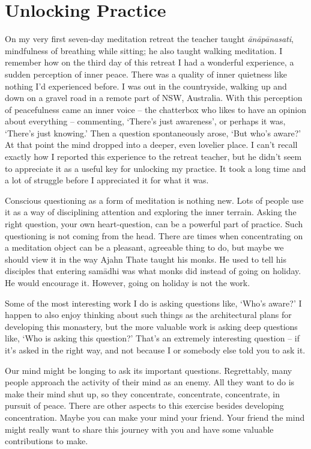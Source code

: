 \section{Unlocking Practice}

On my very first seven-day meditation retreat the teacher taught
\emph{ānāpānasati}, mindfulness of breathing while sitting; he also taught
walking meditation. I remember how on the third day of this retreat I
had a wonderful experience, a sudden perception of inner peace. There
was a quality of inner quietness like nothing I’d experienced before. I
was out in the countryside, walking up and down on a gravel road in a
remote part of NSW, Australia. With this perception of peacefulness came
an inner voice – the chatterbox who likes to have an opinion about
everything – commenting, ‘There’s just awareness’, or perhaps it was,
‘There’s just knowing.’ Then a question spontaneously arose, ‘But who’s
aware?’ At that point the mind dropped into a deeper, even lovelier
place. I can’t recall exactly how I reported this experience to the
retreat teacher, but he didn’t seem to appreciate it as a useful key for
unlocking my practice. It took a long time and a lot of struggle before
I appreciated it for what it was.

Conscious questioning as a form of meditation is nothing new. Lots of
people use it as a way of disciplining attention and exploring the inner
terrain. Asking the right question, your own heart-question, can be a
powerful part of practice. Such questioning is not coming from the head.
There are times when concentrating on a meditation object can be a
pleasant, agreeable thing to do, but maybe we should view it in the way
Ajahn Thate\cite{ajahn-thate} taught his monks.
He used to tell his disciples that
entering samādhi was what monks did instead of going on holiday. He
would encourage it. However, going on holiday is not the work.

Some of the most interesting work I do is asking questions like, ‘Who’s
aware?’ I happen to also enjoy thinking about such things as the
architectural plans for developing this monastery, but the more valuable
work is asking deep questions like, ‘Who is asking this question?’
That’s an extremely interesting question – if it’s asked in the right
way, and not because I or somebody else told you to ask it.

Our mind might be longing to ask its important questions. Regrettably,
many people approach the activity of their mind as an enemy. All they
want to do is make their mind shut up, so they concentrate, concentrate,
concentrate, in pursuit of peace. There are other aspects to this
exercise besides developing concentration. Maybe you can make your mind
your friend. Your friend the mind might really want to share this
journey with you and have some valuable contributions to make.

